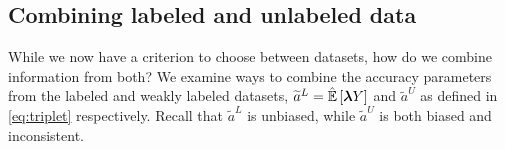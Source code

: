 %




\subsection{Combining labeled and unlabeled data}
While we now have a criterion to choose between datasets, how do we combine information from both? We examine ways to combine the accuracy parameters from the labeled and weakly labeled datasets,  $\widetilde{a}^L = \hat{\mathbb{E}}\left[\bm{\lambda} Y\right]$ and $\widetilde{a}^U$ as defined in \eqref{eq:triplet} respectively. Recall that $\widetilde{a}^L$ is unbiased, while $\widetilde{a}^U$ is both biased and inconsistent. 

